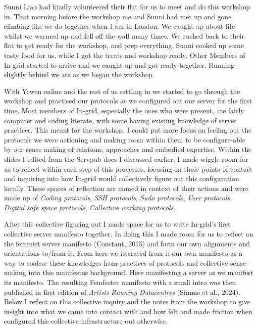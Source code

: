 Sunni Liao had kindly volunteered their flat for us to meet and do this
workshop in. That morning before the workshop me and Sunni had met up
and gone climbing like we do together when I am in London. We caught up
about life whilst we warmed up and fell off the wall many times. We
rushed back to their flat to get ready for the workshop, and prep
everything. Sunni cooked up some tasty food for us, while I got the
treats and workshop ready. Other Members of In-grid started to arrive
and we caught up and got ready together. Running slightly behind we ate
as we began the workshop.

With Yewen online and the rest of us settling in we started to go
through the workshop and practised our protocols as we configured out
our server for the first time. Most members of In-grid, especially the
ones who were present, are fairly computer and coding literate, with
some having existing knowledge of server practices. This meant for the
workshop, I could put more focus on feeling out the protocols we were
actioning and making room within them to be configure-able by our sense
making of relations, approaches and embodied expertise. Within the
slides I edited from the Servpub docs I discussed earlier, I made wiggle
room for us to reflect within each step of this processes, focusing on
these points of contact and inquiring into how In-grid would
collectively figure out this configuration locally. These spaces of
reflection are named in context of their actions and were made up of
\emph{Coding protocols}, \emph{SSH protocols}, \emph{Sudo protocols},
\emph{User protocols}, \emph{Digital safe space protocols},
\emph{Collective working protocols}.

After this collective figuring out I made space for us to write
In-grid's first collective server manifesto together. In doing this I
made room for us to reflect on the feminist server manifesto (Constant,
2015) and form our own alignments and orientations to/from it. From here
we itterated from it our own manifesto as a way to coalese these
knowledges from practices of protocols and collective sense-making into
this manifestos background. Here manifesting a server as we manifest its
manifesto. The resulting Femfester manifesto with a small intro was then
published in first edition of \emph{Artists Running Datacentres} (Simms
et al., 2024). Below I reflect on this collective inquiry and the
\href{https://femfester.in-grid.io/}{notes} from the workshop to give
insight into what we came into contact with and how felt and made
friction when configured this collective infrastructure out otherwise.

